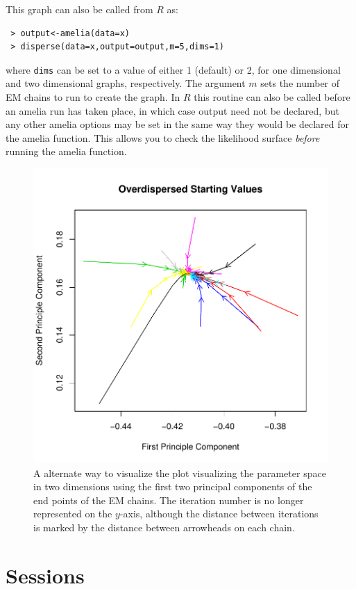 \documentclass[12pt,titlepage]{article}
\begin{document}
This graph can also be called from $R$ as:
\begin{verbatim}
 > output<-amelia(data=x) 
 > disperse(data=x,output=output,m=5,dims=1)
\end{verbatim}
where \texttt{dims} can be set to a value of either 1 (default) or 2,
for one dimensional and two dimensional graphs, respectively.  The
argument $m$ sets the number of EM chains to run to create the graph.
In $R$ this routine can also be called before an amelia run has taken
place, in which case output need not be declared, but any other amelia
options may be set in the same way they would be declared for the
amelia function.  This allows you to check the likelihood surface
\emph{before} running the amelia function.
\begin{figure}
  \centering \includegraphics[scale=.7]{overdis2d}
  \caption{ A alternate way to visualize the plot visualizing the
    parameter space in two dimensions using the first two principal
    components of the end points of the EM chains.  The iteration
    number is no longer represented on the $y$-axis, although the
    distance between iterations is marked by the distance between
    arrowheads on each chain.}
\end{figure}

\section{Sessions}
\label{sec:sessions}
\end{document}
